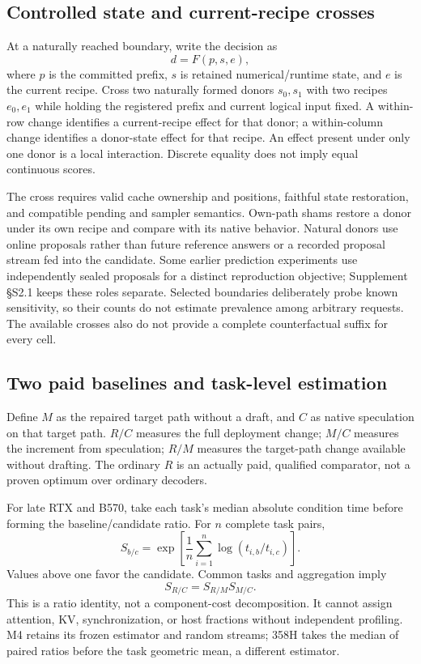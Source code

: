 \subsection{Controlled state and current-recipe crosses}
At a naturally reached boundary, write the decision as
\begin{equation}
d=F(p,s,e),
\label{eq:decision}
\end{equation}
where $p$ is the committed prefix, $s$ is retained numerical/runtime state, and $e$ is the current recipe. Cross two naturally formed donors $s_0,s_1$ with two recipes $e_0,e_1$ while holding the registered prefix and current logical input fixed. A within-row change identifies a current-recipe effect for that donor; a within-column change identifies a donor-state effect for that recipe. An effect present under only one donor is a local interaction. Discrete equality does not imply equal continuous scores.

The cross requires valid cache ownership and positions, faithful state restoration, and compatible pending and sampler semantics. Own-path shams restore a donor under its own recipe and compare with its native behavior. Natural donors use online proposals rather than future reference answers or a recorded proposal stream fed into the candidate. Some earlier prediction experiments use independently sealed proposals for a distinct reproduction objective; Supplement \S S2.1 keeps these roles separate. Selected boundaries deliberately probe known sensitivity, so their counts do not estimate prevalence among arbitrary requests. The available crosses also do not provide a complete counterfactual suffix for every cell.

\subsection{Two paid baselines and task-level estimation}
Define $M$ as the repaired target path without a draft, and $C$ as native speculation on that target path. $R/C$ measures the full deployment change; $M/C$ measures the increment from speculation; $R/M$ measures the target-path change available without drafting. The ordinary $R$ is an actually paid, qualified comparator, not a proven optimum over ordinary decoders.

For late RTX and B570, take each task's median absolute condition time before forming the baseline/candidate ratio. For $n$ complete task pairs,
\begin{equation}
S_{b/c}=\exp\left[\frac{1}{n}\sum_{i=1}^{n}\log\left(t_{i,b}/t_{i,c}\right)\right].
\label{eq:gm}
\end{equation}
Values above one favor the candidate. Common tasks and aggregation imply
\begin{equation}
S_{R/C}=S_{R/M}S_{M/C}.
\label{eq:identity}
\end{equation}
This is a ratio identity, not a component-cost decomposition. It cannot assign attention, KV, synchronization, or host fractions without independent profiling. M4 retains its frozen estimator and random streams; 358H takes the median of paired ratios before the task geometric mean, a different estimator.

